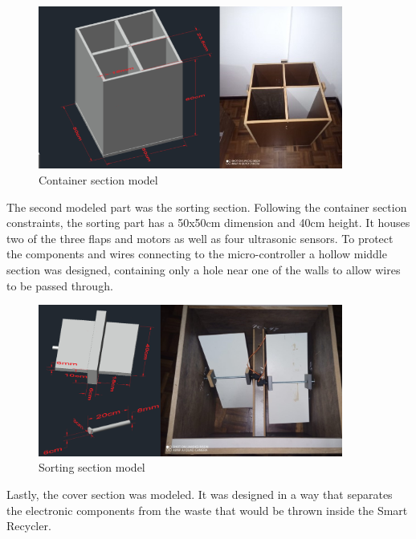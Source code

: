 \documentclass[a4paper,11pt]{article}
\begin{document}
\begin{figure}[H]
  \centering
  \includegraphics[width=10cm]{Figures/Container Block.png}
  \caption{\small{Container section model}}
  \label{fig:containerModel}
\end{figure}

The second modeled part was the sorting section. Following the container section constraints, the sorting part has a 50x50cm dimension and 40cm height. It houses two of the three flaps and motors as well as four ultrasonic sensors. To protect the components and wires connecting to the micro-controller a hollow middle section was designed, containing only a hole near one of the walls to allow wires to be passed through.

\begin{figure}[H]
  \centering
  \includegraphics[width=10cm]{Figures/Sorting2.png}
  \caption{\small{Sorting section model}}
  \label{fig:sortingModel1}
\end{figure}

Lastly, the cover section was modeled. It was designed in a way that separates the electronic components from the waste that would be thrown inside the Smart Recycler.
\end{document}
